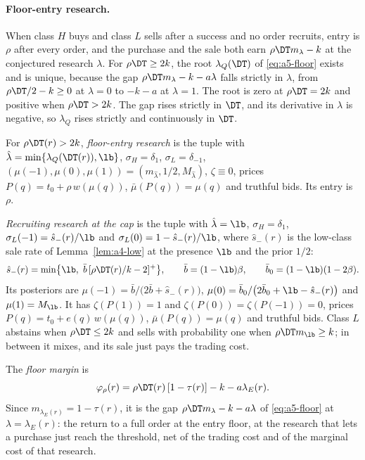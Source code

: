 \paragraph{Floor-entry research.}
When class \(H\) buys and class \(L\) sells after a success and no order recruits, entry is \(\rho\) after every
order, and the purchase and the sale both earn \(\rho\DT m_\lambda-k\) at the conjectured research \(\lambda\). For
\(\rho\DT\ge2k\), the root \(\lambda_Q(\DT)\) of \eqref{eq:a5-floor} exists and is unique, because
the gap \(\rho\DT m_\lambda-k-a\lambda\) falls strictly in \(\lambda\), from
\(\rho\DT/2-k\ge0\) at \(\lambda=0\) to \(-k-a\) at \(\lambda=1\). The root is zero at
\(\rho\DT=2k\) and positive when \(\rho\DT>2k\). The gap rises
strictly in \(\DT\), and its derivative in \(\lambda\) is negative, so \(\lambda_Q\) rises strictly and continuously
in \(\DT\).

For \(\rho\DT(r)>2k\), \emph{floor-entry research} is the tuple with \(\hat\lambda=\min\{\lambda_Q(\DT(r)),\lb\}\),
\(\sigma_H=\delta_1\), \(\sigma_L=\delta_{-1}\), \((\mu(-1),\mu(0),\mu(1))=(m_{\hat\lambda},1/2,M_{\hat\lambda})\),
\(\zeta\equiv0\), prices \(P(q)=t_0+\rho\,w(\mu(q))\), \(\bar\mu(P(q))=\mu(q)\) and truthful bids. Its entry is
\(\rho\).

\emph{Recruiting research at the cap} is the tuple with \(\hat\lambda=\lb\), \(\sigma_H=\delta_1\),
\(\sigma_L(-1)=\hat s_-(r)/\lb\) and \(\sigma_L(0)=1-\hat s_-(r)/\lb\), where \(\hat s_-(r)\) is the low-class sale rate
of Lemma~\ref{lem:a4-low} at the presence \(\lb\) and the prior \(1/2\):
\[
\hat s_-(r)=\min\bigl\{\lb,\ \bar b\,[\rho\DT(r)/k-2]^+\bigr\},\qquad \bar b=(1-\lb)\beta,\qquad
\bar b_0=(1-\lb)(1-2\beta).
\]
Its posteriors are \(\mu(-1)=\bar b/\bigl(2\bar b+\hat s_-(r)\bigr)\),
\(\mu(0)=\bar b_0/\bigl(2\bar b_0+\lb-\hat s_-(r)\bigr)\) and \(\mu(1)=M_{\lb}\). It has \(\zeta(P(1))=1\) and
\(\zeta(P(0))=\zeta(P(-1))=0\), prices \(P(q)=t_0+e(q)\,w(\mu(q))\), \(\bar\mu(P(q))=\mu(q)\) and truthful bids.
Class \(L\) abstains when \(\rho\DT\le2k\) and sells with probability one when \(\rho\DT m_{\lb}\ge k\); in between it
mixes, and its sale just pays the trading cost.

The \emph{floor margin} is
\[
\varphi_\rho(r)=\rho\DT(r)\,[1-\tau(r)]-k-a\lambda_E(r).
\]
Since \(m_{\lambda_E(r)}=1-\tau(r)\), it is the gap \(\rho\DT m_\lambda-k-a\lambda\) of \eqref{eq:a5-floor} at
\(\lambda=\lambda_E(r)\): the return to a full order at the entry floor, at the research that lets a purchase just
reach the threshold, net of the trading cost and of the marginal cost of that research.

